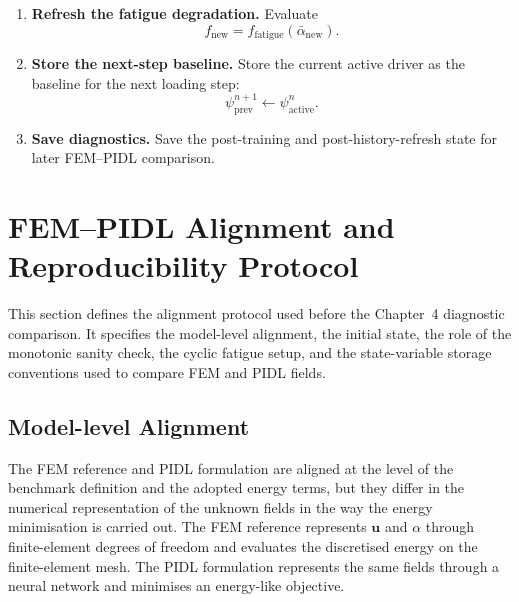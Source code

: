 \begin{enumerate}
    \item \textbf{Refresh the fatigue degradation.} Evaluate
    \[
    f_{\mathrm{new}}
    =
    f_{\mathrm{fatigue}}
    \left(
    \bar{\alpha}_{\mathrm{new}}
    \right).
    \]

    \item \textbf{Store the next-step baseline.} Store the current active driver as the baseline for the next loading step:
    \[
    \psi_{\mathrm{prev}}^{n+1}
    \leftarrow
    \psi_{\mathrm{active}}^{n}.
    \]

    \item \textbf{Save diagnostics.} Save the post-training and post-history-refresh state for later FEM--PIDL comparison.
\end{enumerate}

\FloatBarrier



\section{FEM--PIDL Alignment and Reproducibility Protocol}
\label{sec:c3_alignment_protocol}

This section defines the alignment protocol used before the Chapter~4 diagnostic comparison. It specifies the model-level alignment, the initial state, the role of the monotonic sanity check, the cyclic fatigue setup, and the state-variable storage conventions used to compare FEM and PIDL fields.

\subsection{Model-level Alignment}

The FEM reference and PIDL formulation are aligned at the level of the benchmark definition and the adopted energy terms, but they differ in the numerical representation of the unknown fields in the way the energy minimisation is carried out. The FEM reference represents \(\mathbf{u}\) and \(\alpha\) through finite-element degrees of freedom and evaluates the discretised energy on the finite-element mesh. The PIDL formulation represents the same fields through a neural network and minimises an energy-like objective. 

